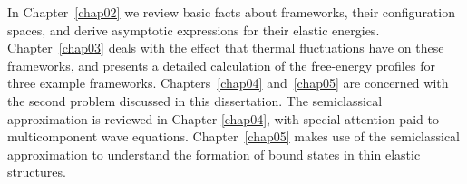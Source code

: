 In Chapter~\ref{chap02} we review basic facts about frameworks, their configuration spaces, and derive asymptotic expressions for their elastic energies.
Chapter~\ref{chap03} deals with the effect that thermal fluctuations have on these frameworks, and presents a detailed calculation of the free-energy profiles for three example frameworks.
Chapters~\ref{chap04} and~\ref{chap05} are concerned with the second problem discussed in this dissertation.
The semiclassical approximation is reviewed in Chapter \ref{chap04}, with special attention paid to multicomponent wave equations.
Chapter~\ref{chap05} makes use of the semiclassical approximation to understand the formation of bound states in thin elastic structures.
